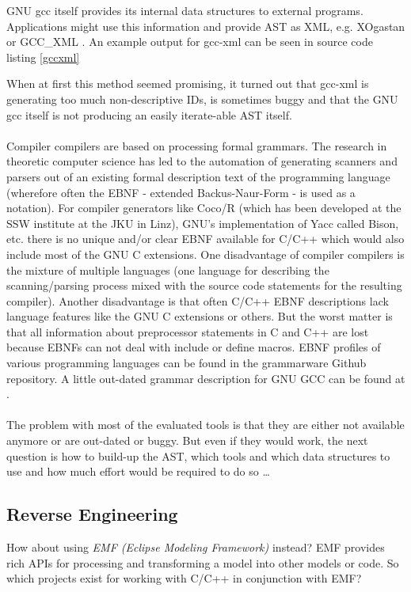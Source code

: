GNU gcc itself provides its internal data structures to external programs.
Applications might use this information and provide AST as XML, e.g.
XOgastan\cite{XOgastan} or 
GCC\_XML \cite{gccxml}.
An example
output for gcc-xml can be seen in source code listing \ref{gccxml}

When at first this method seemed promising, it turned out
that gcc-xml is generating too much non-descriptive IDs, is
sometimes buggy and that the GNU gcc itself is not producing
an easily iterate-able AST itself.
\\ \ \\
Compiler compilers are based on processing formal
grammars. The research in theoretic computer science has led
to the automation of generating scanners and parsers out of an
existing formal description text of the programming language
(wherefore often the EBNF - extended Backus-Naur-Form - is
used as a notation).
For compiler generators like Coco/R\cite{COCOR}
(which has been developed at the SSW
institute at the JKU in Linz), 
GNU's implementation of Yacc called Bison\cite{Bison}, etc. there is no unique 
and/or clear EBNF available for C/C++ which would also include most of the GNU C extensions.
One disadvantage of compiler
compilers is the mixture of multiple languages (one language
for describing the scanning/parsing process mixed with the
source code statements for the resulting compiler). Another
disadvantage is that often C/C++ EBNF descriptions lack
language features like the GNU C extensions or others. But the worst
matter is that all information about preprocessor statements
in C and C++ are lost because EBNFs can not deal with
include or define macros.
EBNF profiles of various programming languages can
be found in the grammarware Github repository\cite{Grammarzoo}.
A little out-dated grammar description 
for GNU GCC can be found at \cite{GNUCEBNF}.
\\ \ \\
The problem with most of the evaluated tools is that they are either 
not available anymore or are out-dated or buggy.
But even if they would work, 
the next question is how to build-up the AST, 
which tools and which data structures to use and 
how much effort would be required to do so \dots

\subsection{Reverse Engineering}
How about using {\it EMF (Eclipse Modeling Framework)}
\cite{Eclipse_EMF}
\cite{steinberg2008emf}
instead? EMF provides rich APIs for processing and transforming 
a model into other models or code.
%
So which projects
exist for working with C/C++ in conjunction with EMF?

